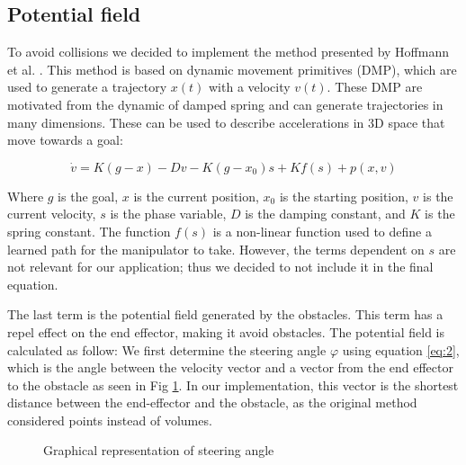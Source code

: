 \documentclass[a4paper, 10pt, conference]{ieeeconf}      %
\begin{document}
\subsection{Potential field} %

To avoid collisions we decided to implement the method presented by Hoffmann et al. \cite{Hoffmann}. This method is based on dynamic movement primitives (DMP), which are used to generate a trajectory $x(t)$ with a velocity $v(t)$. These DMP are motivated from the dynamic of damped spring and can generate trajectories in many dimensions. These can be used to describe accelerations in 3D space that move towards a goal:

\begin{equation} \label{eq:1}
	\dot{v} = K ( g - x ) - D v - K (g - x_0) s + K f(s) + p(x, v)
\end{equation}

Where $g$ is the goal, $x$ is the current position, $x_0$ is the starting position, $v$ is the current velocity, $s$ is the phase variable, $D$ is the damping constant, and $K$ is the spring constant. The function $f(s)$ is a non-linear function used to define a learned path for the manipulator to take. However, the terms dependent on $s$ are not relevant for our application; thus we decided to not include it in the final equation.  

The last term is the potential field generated by the obstacles. This term has a repel effect on the end effector, making it avoid obstacles. The potential field is calculated as follow: We first determine the steering angle $\varphi$ using equation \ref{eq:2}, which is the angle between the velocity vector and a vector from the end effector to the obstacle as seen in Fig \ref{steering_image}. In our implementation, this vector is the shortest distance between the end-effector and the obstacle, as the original method considered points instead of volumes.


\begin{figure}
	\centering
	\caption{Graphical representation of steering angle \cite{1}}
	\label{steering_image}
\end{figure}
\end{document}

